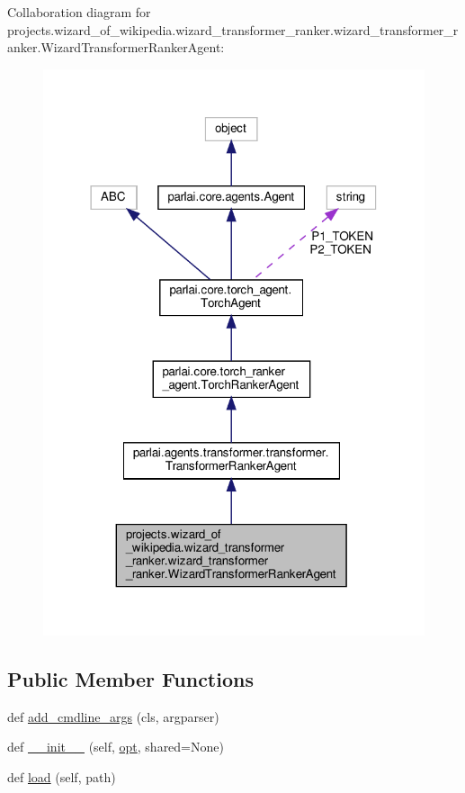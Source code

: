 Collaboration diagram for projects.\+wizard\+\_\+of\+\_\+wikipedia.\+wizard\+\_\+transformer\+\_\+ranker.\+wizard\+\_\+transformer\+\_\+ranker.\+Wizard\+Transformer\+Ranker\+Agent\+:
\nopagebreak
\begin{figure}[H]
\begin{center}
\leavevmode
\includegraphics[width=318pt]{d6/d32/classprojects_1_1wizard__of__wikipedia_1_1wizard__transformer__ranker_1_1wizard__transformer__ra5ca474d676e0832cca4857ef332d07fd}
\end{center}
\end{figure}
\subsection*{Public Member Functions}
\begin{DoxyCompactItemize}
\item 
def \hyperlink{classprojects_1_1wizard__of__wikipedia_1_1wizard__transformer__ranker_1_1wizard__transformer__rad02f16524e5e0423aa3e2c69e1330ee1_a8dea037d2903975503586b5aa5c8bd36}{add\+\_\+cmdline\+\_\+args} (cls, argparser)
\item 
def \hyperlink{classprojects_1_1wizard__of__wikipedia_1_1wizard__transformer__ranker_1_1wizard__transformer__rad02f16524e5e0423aa3e2c69e1330ee1_ab5d22f936f8fb1a53569b750e8947edd}{\+\_\+\+\_\+init\+\_\+\+\_\+} (self, \hyperlink{classparlai_1_1core_1_1torch__agent_1_1TorchAgent_a785bb920cf8c8afc3e9bf6a8b77e335a}{opt}, shared=None)
\item 
def \hyperlink{classprojects_1_1wizard__of__wikipedia_1_1wizard__transformer__ranker_1_1wizard__transformer__rad02f16524e5e0423aa3e2c69e1330ee1_abc21f0fa56df7a5cd42a011b66eed02b}{load} (self, path)
\end{DoxyCompactItemize}

